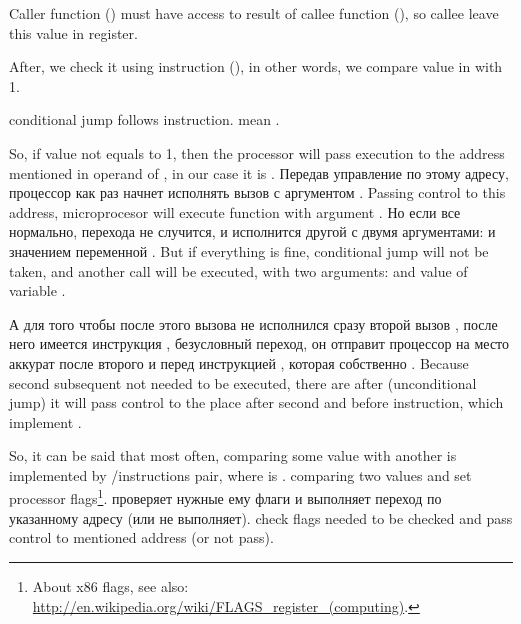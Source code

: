 {Caller function (\main) must have access to result of callee function (\scanf), 
so callee leave this value in \EAX register.}

{After, we check it using instruction  (), 
in other words, we compare value in \EAX with 1.} 

{\JNE conditional jump follows \CMP instruction. \JNE mean .}

{So, if \EAX value not equals to 1, then the processor will pass execution to the 
address mentioned in operand of \JNE, in our case it is .}
\IFRU
{Передав управление по этому адресу, процессор как раз начнет исполнять вызов \printf с 
аргументом .}
{Passing control to this address, microprocesor will execute function \printf 
with argument .}
\IFRU
{Но если все нормально, перехода не случится, и исполнится другой \printf с двумя аргументами: 
 и значением переменной .}
{But if everything is fine, conditional jump will not be taken, and another \printf call 
will be executed, with two arguments:  and value of variable . }

\IFRU
{А для того чтобы после этого вызова не исполнился сразу второй вызов \printf, 
после него имеется инструкция \JMP, безусловный переход, он отправит процессор на место аккурат 
после второго \printf и перед инструкцией , которая собственно .}
{Because second subsequent \printf not needed to be executed, there are \JMP after (unconditional jump) 
it will pass control to the place after second \printf and before  instruction, 
which implement .}

{So, it can be said that most often, comparing some value with another is implemented 
by \CMP/\Jcc instructions pair, where  is .}
{\CMP comparing two values and set 
processor flags\footnote{About x86 flags, see also: \url{http://en.wikipedia.org/wiki/FLAGS_register_(computing)}.}.}
\IFRU
{\Jcc проверяет нужные ему флаги и выполняет переход по указанному адресу (или не выполняет).}
{\Jcc check flags needed to be checked and pass control to mentioned address (or not pass).}


